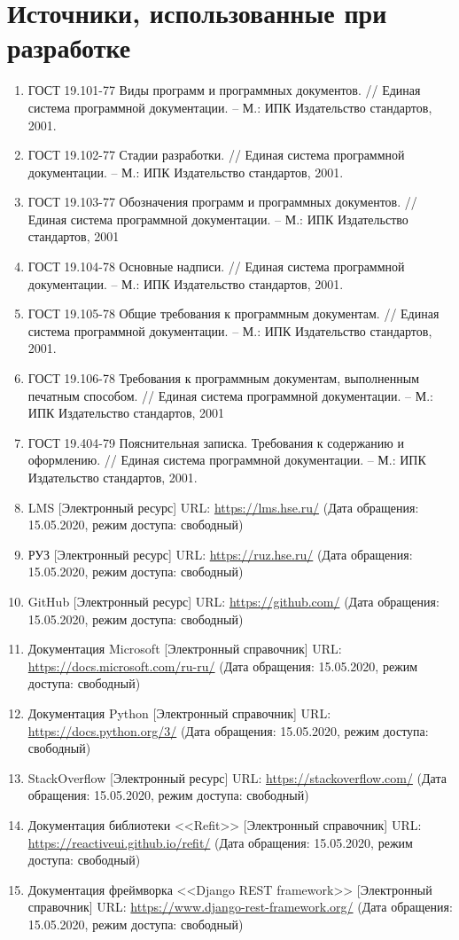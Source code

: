 \documentclass{../includes/TechDoc}
\begin{document}
    \section{Источники, использованные при разработке}

    \begin{enumerate}
        \item ГОСТ 19.101-77 Виды программ и программных документов. // Единая система программной документации. – М.: ИПК Издательство стандартов, 2001.
        \item ГОСТ 19.102-77 Стадии разработки. // Единая система программной документации. – М.: ИПК Издательство стандартов, 2001.
        \item ГОСТ 19.103-77 Обозначения программ и программных документов. // Единая система программной документации. – М.: ИПК Издательство стандартов, 2001
        \item ГОСТ 19.104-78 Основные надписи. // Единая система программной документации. – М.: ИПК Издательство стандартов, 2001.
        \item ГОСТ 19.105-78 Общие требования к программным документам. // Единая система программной документации. – М.: ИПК Издательство стандартов, 2001.
        \item ГОСТ 19.106-78 Требования к программным документам, выполненным печатным способом. // Единая система программной документации. – М.: ИПК Издательство стандартов, 2001
        \item ГОСТ 19.404-79 Пояснительная записка. Требования к содержанию и оформлению. // Единая система программной документации. – М.: ИПК Издательство стандартов, 2001.
        \item LMS [Электронный ресурс] URL: \url{https://lms.hse.ru/} (Дата обращения: 15.05.2020, режим доступа: свободный)
        \item РУЗ [Электронный ресурс] URL: \url{https://ruz.hse.ru/} (Дата обращения: 15.05.2020, режим доступа: свободный)
        \item GitHub [Электронный ресурс] URL: \url{https://github.com/} (Дата обращения: 15.05.2020, режим доступа: свободный)
        \item Документация Microsoft [Электронный справочник] URL: \url{https://docs.microsoft.com/ru-ru/} (Дата обращения: 15.05.2020, режим доступа: свободный)
        \item Документация Python [Электронный справочник] URL: \url{https://docs.python.org/3/} (Дата обращения: 15.05.2020, режим доступа: свободный)
        \item StackOverflow [Электронный ресурс] URL: \url{https://stackoverflow.com/} (Дата обращения: 15.05.2020, режим доступа: свободный)
        \item Документация библиотеки <<Refit>> [Электронный справочник] URL: \url{https://reactiveui.github.io/refit/} (Дата обращения: 15.05.2020, режим доступа: свободный)
        \item Документация фреймворка <<Django REST framework>> [Электронный справочник] URL: \url{https://www.django-rest-framework.org/} (Дата обращения: 15.05.2020, режим доступа: свободный)
    \end{enumerate}
\end{document}
